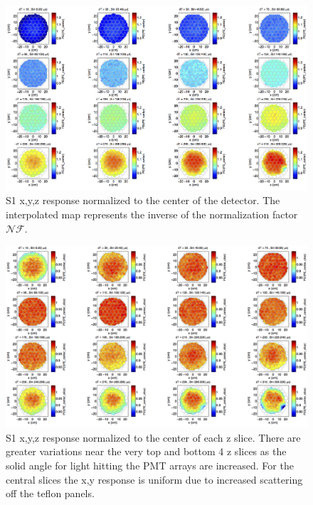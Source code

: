 \begin{figure}[h!]\centering
\includegraphics[width=150mm]{Chapter_XYZ_Corr/Thesis_Corr_Plots/S1_XYZ_Kr_norm_center_crop_80.png}
\caption{S1 x,y,z response normalized to the center of the detector. The interpolated map represents the inverse of the normalization factor $\mathcal{NF}$. }
\label{fig:S1_XYZ_norm_center}
\end{figure}

\begin{figure}[h!]\centering
\includegraphics[width=150mm]{Chapter_XYZ_Corr/Thesis_Corr_Plots/S1_XYZ_Kr_norm_center_slice_crop.png}
\caption{S1 x,y,z response normalized to the center of each z slice. There are greater variations near the very top and bottom 4 z slices as the solid angle for light hitting the PMT arrays are increased. For the central slices the x,y response is uniform due to increased scattering off the teflon panels. }
\label{fig:S1_XYZ_norm_center_slice}
\end{figure}

